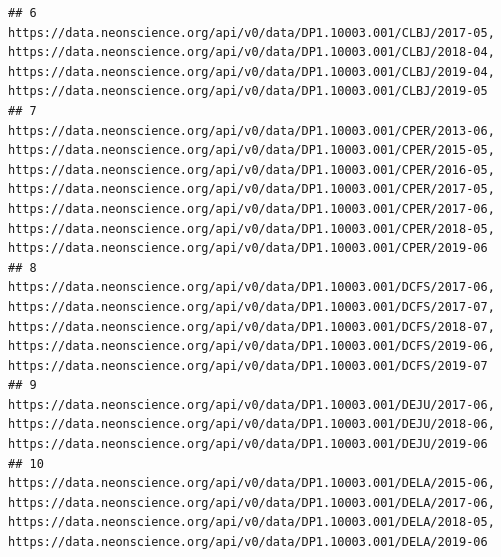 \documentclass[]{book}
\begin{document}
\begin{verbatim}
## 6                                                                                                                                                                                                                                                                                                                                                           https://data.neonscience.org/api/v0/data/DP1.10003.001/CLBJ/2017-05, https://data.neonscience.org/api/v0/data/DP1.10003.001/CLBJ/2018-04, https://data.neonscience.org/api/v0/data/DP1.10003.001/CLBJ/2019-04, https://data.neonscience.org/api/v0/data/DP1.10003.001/CLBJ/2019-05
## 7                                                                                                                                            https://data.neonscience.org/api/v0/data/DP1.10003.001/CPER/2013-06, https://data.neonscience.org/api/v0/data/DP1.10003.001/CPER/2015-05, https://data.neonscience.org/api/v0/data/DP1.10003.001/CPER/2016-05, https://data.neonscience.org/api/v0/data/DP1.10003.001/CPER/2017-05, https://data.neonscience.org/api/v0/data/DP1.10003.001/CPER/2017-06, https://data.neonscience.org/api/v0/data/DP1.10003.001/CPER/2018-05, https://data.neonscience.org/api/v0/data/DP1.10003.001/CPER/2019-06
## 8                                                                                                                                                                                                                                                                                      https://data.neonscience.org/api/v0/data/DP1.10003.001/DCFS/2017-06, https://data.neonscience.org/api/v0/data/DP1.10003.001/DCFS/2017-07, https://data.neonscience.org/api/v0/data/DP1.10003.001/DCFS/2018-07, https://data.neonscience.org/api/v0/data/DP1.10003.001/DCFS/2019-06, https://data.neonscience.org/api/v0/data/DP1.10003.001/DCFS/2019-07
## 9                                                                                                                                                                                                                                                                                                                                                                                                                                https://data.neonscience.org/api/v0/data/DP1.10003.001/DEJU/2017-06, https://data.neonscience.org/api/v0/data/DP1.10003.001/DEJU/2018-06, https://data.neonscience.org/api/v0/data/DP1.10003.001/DEJU/2019-06
## 10                                                                                                                                                                                                                                                                                                                                                          https://data.neonscience.org/api/v0/data/DP1.10003.001/DELA/2015-06, https://data.neonscience.org/api/v0/data/DP1.10003.001/DELA/2017-06, https://data.neonscience.org/api/v0/data/DP1.10003.001/DELA/2018-05, https://data.neonscience.org/api/v0/data/DP1.10003.001/DELA/2019-06

\end{verbatim}
\end{document}
